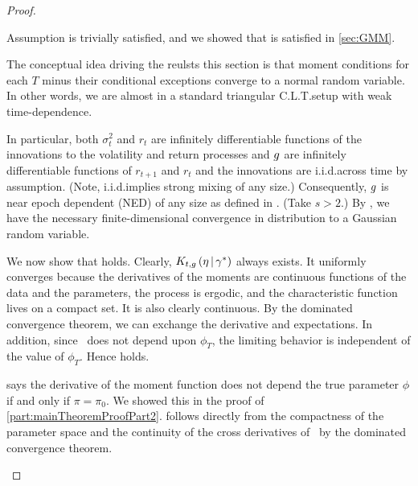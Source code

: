 \documentclass[11pt, letterpaper, twoside, final]{article}
\begin{document}
\begin{appendices}
\begin{proof}
\begin{proofpart}
\end{proofpart}

\begin{proofpart}
    \label{part:mainTheoremProofPart3}

    Assumption  is trivially satisfied,  and we showed that  is satisfied
    in \cref{sec:GMM}.  
        
    The conceptual idea driving the reulsts this section is that moment conditions for each $T$ minus their
    conditional exceptions converge to a normal random variable.
    In other words, we are almost in a standard triangular C.L.T.\@ setup with weak time-dependence.

    In particular, both $\sigma^2_t$ and $r_t$ are infinitely differentiable functions of the innovations to
    the volatility and return processes and $g$ are infinitely differentiable functions of $r_{t+1}$ and
    $r_t$ and the innovations are i.i.d.\@ across time by assumption.
    (Note, i.i.d.\@ implies strong mixing of any size.)
    Consequently, $g$ is near epoch dependent (NED) of any size as defined in
    \textcite{andrews1991empirical}.  
    (Take $s>2.$) 
    By \textcite[Theorem 3]{andrews1991empirical}, we have the necessary finite-dimensional convergence in
    distribution to a Gaussian random variable. 

    We now show that  holds.
    Clearly, $K_{t,g}\left(\eta \,\middle\vert\, \gamma^{*}\right)$ always exists.
    It uniformly converges because the derivatives of the moments are continuous functions of the data and the
    parameters, the process is ergodic, and the characteristic function lives on a compact set.
    It is also clearly continuous.
    By the dominated convergence theorem, we can exchange the derivative and expectations.
    In addition, since \popmom\ does not depend upon $\phi_T$, the limiting behavior is independent of the value
    of $\phi_T$.
    Hence  holds.
    
     says the derivative of the moment function does not depend the true parameter $\phi$ if
    and only if  $\pi =  \pi_0$. 
    We showed this in the proof of \cref{part:mainTheoremProofPart2}.
     follows directly from the compactness of the parameter space and the continuity of the
    cross derivatives of \popmom\ by the dominated convergence theorem.

\end{proofpart}


\end{proof}
\end{appendices}
\end{document}
